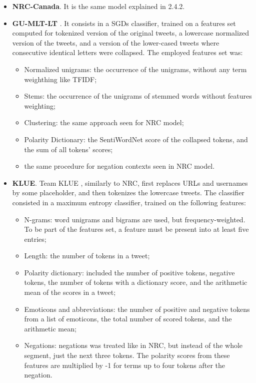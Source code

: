 \begin{itemize}
	\item \textbf{NRC-Canada}. It is the same model explained in 2.4.2.
	\item \textbf{GU-MLT-LT} \cite{gunther-furrer-2013-gu}. It consists in a \aclp{SGD} classifier, trained on a features set computed for tokenized version of the original tweets, a lowercase normalized version of the tweets, and a version of the lower-cased tweets where consecutive identical letters were collapsed. The employed features set was:
	\begin{itemize}
		\item Normalized unigrams: the occurrence of the unigrams, without any term weighthing like \ac{TFIDF};
		\item Stems: the occurrence of the unigrams of stemmed words without features weighting;
		\item Clustering: the same approach seen for NRC model;
		\item Polarity Dictionary: the SentiWordNet score of the collapsed tokens, and the sum of all tokens' scores;
		\item the same procedure for negation contexts seen in NRC model.
	\end{itemize}
	\item \textbf{KLUE}. Team KLUE \cite{klue}, similarly to NRC, first replaces URLs and usernames by some placeholder, and then tokenizes the lowercase tweets. The classifier consisted in a maximum entropy classifier, trained on the following features:
	\begin{itemize}
		\item N-grams: word unigrams and bigrams are used, but frequency-weighted. To be part of the features set, a feature must be present into at least five entries;
		\item Length: the number of tokens in a tweet;
		\item Polarity dictionary: included the number of positive tokens, negative tokens, the number of tokens with a dictionary score, and the arithmetic mean of the scores in a tweet;
		\item Emoticons and abbreviations: the number of positive and negative tokens from a list of emoticons, the total number of scored tokens, and the arithmetic mean;
		\item Negations: negations was treated like in NRC, but instead of the whole segment, just the next three tokens. The polarity scores from these features are multiplied by -1 for terms up to four tokens after the negation.
	\end{itemize}
	

\end{itemize}
